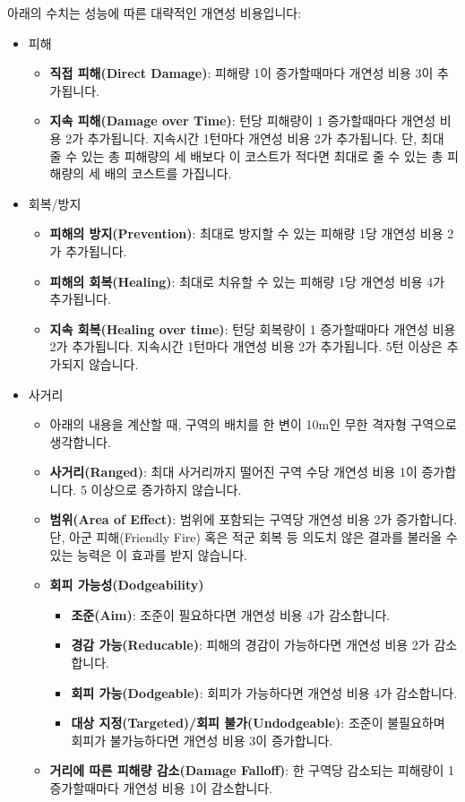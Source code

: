 \documentclass{report}
\begin{document}
	아래의 수치는 성능에 따른 대략적인 개연성 비용입니다:
	\begin{itemize}
		\item 피해
		\begin{itemize}
			\item \textbf{직접 피해(Direct Damage)}: 피해량 1이 증가할때마다 개연성 비용 3이 추가됩니다.
			\item \textbf{지속 피해(Damage over Time)}: 턴당 피해량이 1 증가할때마다 개연성 비용 2가 추가됩니다. 지속시간 1턴마다 개연성 비용 2가 추가됩니다. 단, 최대 줄 수 있는 총 피해량의 세 배보다 이 코스트가 적다면 최대로 줄 수 있는 총 피해량의 세 배의 코스트를 가집니다.
		\end{itemize}
		
		\item 회복/방지
		\begin{itemize}
			\item \textbf{피해의 방지(Prevention)}: 최대로 방지할 수 있는 피해량 1당 개연성 비용 2가 추가됩니다.
			\item \textbf{피해의 회복(Healing)}: 최대로 치유할 수 있는 피해량 1당 개연성 비용 4가 추가됩니다.
			\item \textbf{지속 회복(Healing over time)}: 턴당 회복량이 1 증가할때마다 개연성 비용 2가 추가됩니다. 지속시간 1턴마다 개연성 비용 2가 추가됩니다. 5턴 이상은 추가되지 않습니다.
		\end{itemize}
		
		\item 사거리
		\begin{itemize}
			\item 아래의 내용을 계산할 때, 구역의 배치를 한 변이 10m인 무한 격자형 구역으로 생각합니다.
			\item \textbf{사거리(Ranged)}: 최대 사거리까지 떨어진 구역 수당 개연성 비용 1이 증가합니다. 5 이상으로 증가하지 않습니다.
			\item \textbf{범위(Area of Effect)}: 범위에 포함되는 구역당 개연성 비용 2가 증가합니다. 단, 아군 피해(Friendly Fire) 혹은 적군 회복 등 의도치 않은 결과를 불러올 수 있는 능력은 이 효과를 받지 않습니다.
			\item \textbf{회피 가능성(Dodgeability)}
				\begin{itemize}
					\item \textbf{조준(Aim)}: 조준이 필요하다면 개연성 비용 4가 감소합니다.
					\item \textbf{경감 가능(Reducable)}: 피해의 경감이 가능하다면 개연성 비용 2가 감소합니다.
					\item \textbf{회피 가능(Dodgeable)}: 회피가 가능하다면 개연성 비용 4가 감소합니다.
					\item \textbf{대상 지정(Targeted)/회피 불가(Undodgeable)}: 조준이 불필요하며 회피가 불가능하다면 개연성 비용 3이 증가합니다.
				\end{itemize}
			\item \textbf{거리에 따른 피해량 감소(Damage Falloff)}: 한 구역당 감소되는 피해량이 1 증가할때마다 개연성 비용 1이 감소합니다.
		\end{itemize}
		

\end{itemize}
\end{document}
